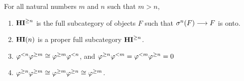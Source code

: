 \begin{prop}\label{prop_THI_properties}
For all natural numbers $m$ and $n$ such that $m > n$,

\begin{enumerate}
\item $\mathbf{HI}^{\geq n}$ is the full subcategory of objects $F$ such that 
$\sigma^{n}(F) \longrightarrow F$ is onto.
\tinyskip

\item $\mathbf{HI}(n)$ is a proper full subcategory $\mathbf{HI}^{\geq n}$.
\tinyskip

\item $\varphi^{< n}\varphi^{\geq m} \cong \varphi^{\geq m}\varphi^{< n}$, and $\varphi^{\geq n}\varphi^{< m} 
= \varphi^{< m}\varphi^{\geq n} = 0$ 
\tinyskip

\item $\varphi^{\geq n}\varphi^{\geq m} \cong \varphi^{\geq m}\varphi^{\geq n} \cong \varphi^{\geq m}$.
\tinyskip
\end{enumerate}
\end{prop}
